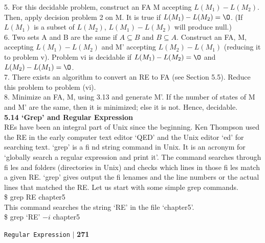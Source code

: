\documentclass{article}
\begin{document}
\textcolor[rgb]{0.00,0.00,1.00}{5}. For this decidable problem, construct an FA M accepting $L(M_1) - L(M_2)$. Then, apply decision
problem 2 on M. It is true if $L(M_1) - L(M_2) = {\O}$. (If $L(M_1)$ is a subset of $L(M_2)$, $L(M_1) - L(M_2)$
will produce null.)\\


\textcolor[rgb]{0.00,0.00,1.00}{6}. Two sets A and B are the same if $A \subseteq B$ and $B \subseteq A$. Construct an FA, M, accepting $L(M_1) - L(M_2)$
and M' accepting $L(M_2) - L(M_1)$ (reducing it to problem v). Problem vi is decidable if $L(M_1) -
L(M_2) = {\O}$ and $L(M_2) - L(M_1) = {\O}$.\\

\textcolor[rgb]{0.00,0.00,1.00}{7}. There exists an algorithm to convert an RE to FA (see Section 5.5). Reduce this problem to problem (vi).\\

\textcolor[rgb]{0.00,0.00,1.00}{8}. Minimize an FA, M, using 3.13 and generate M'. If the number of states of M and M' are the same,
then it is minimized; else it is not. Hence, decidable.\\

\vspace*{0.2cm}
\large{
\textbf{5.14 ‘Grep’ and Regular Expression}\\
}
\small{
REs have been an integral part of Unix since the beginning. Ken Thompson used the RE in the early
computer text editor ‘QED’ and the Unix editor ‘ed’ for searching text. ‘grep’ is a fi nd string command
in Unix. It is an acronym for ‘globally search a regular expression and print it’. The command searches
through fi les and folders (directories in Unix) and checks which lines in those fi les match a given RE.
‘grep’ gives output the fi lenames and the line numbers or the actual lines that matched the RE.
Let us start with some simple grep commands.}\\

\hspace*{4cm}  \$ grep RE chapter5\\

\hspace*{0.5cm} This command searches the string ‘RE’ in the file ‘chapter5’.\\

\hspace*{4cm}  \$ grep ‘RE’ $-i$ chapter5\\

\newpage
\begin{flushright}
 \texttt{Regular Expression} \hspace*{0.1cm}\textbf{$|$} \hspace*{0.1cm} \textbf{271}\hspace*{0.1cm}
\end{flushright}
\end{document}
